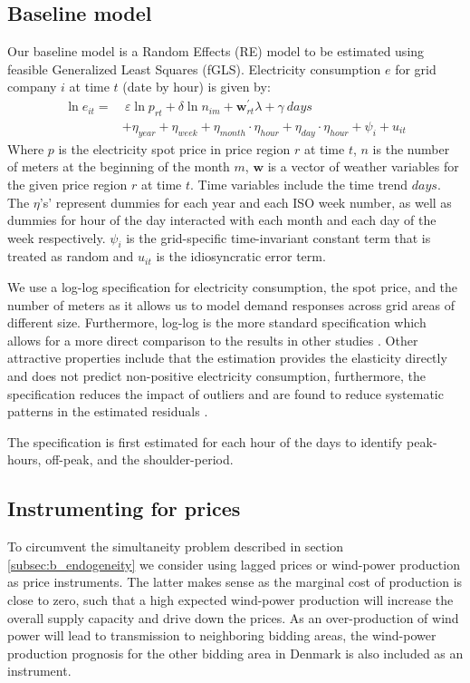 \label{sec:empirical}
\subsection{Baseline model}
\label{subsec:e_model}
Our baseline model is a Random Effects (RE) model to be estimated using feasible Generalized Least Squares (fGLS). Electricity consumption $e$ for grid company $i$ at time $t$ (date by hour) is given by:
\begin{equation}
  \begin{split}
  \ln e_{it}=&\ \varepsilon\ln p_{rt}+\delta\ln n_{im}+\bm{w}^{'}_{rt}\lambda+\gamma\ days\\
  &+\eta_{year}+\eta_{week}+\eta_{month}\cdot\eta_{hour}+\eta_{day}\cdot\eta_{hour}+\psi_i+u_{it}
  \end{split}
  \label{eq:baseline}
\end{equation}
Where $p$ is the electricity spot price in price region $r$ at time $t$, $n$ is the number of meters at the beginning of the month $m$, $\bm{w}$ is a vector of weather variables for the given price region $r$ at time $t$. Time variables include the time trend $days$. The $\eta$'s' represent dummies for each year and each ISO week number, as well as dummies for hour of the day interacted with each month and each day of the week respectively. $\psi_i$ is the grid-specific time-invariant constant term that is treated as random and $u_{it}$ is the idiosyncratic error term.
\par
We use a log-log specification for electricity consumption, the spot price, and the number of meters as it allows us to model demand responses across grid areas of different size. Furthermore, log-log is the more standard specification which allows for a more direct comparison to the results in other studies \citep{burke2017price}. Other attractive properties include that the estimation provides the elasticity directly and does not predict non-positive electricity consumption, furthermore, the specification reduces the impact of outliers and are found to reduce systematic patterns in the estimated residuals \citep{burke2017price}.
\par
The specification is first estimated for each hour of the days to identify peak-hours, off-peak, and the shoulder-period.

\subsection{Instrumenting for prices}
\label{subsec:e_instrumenting}
To circumvent the simultaneity problem described in section \ref{subsec:b_endogeneity} we consider using lagged prices or wind-power production as price instruments. The latter makes sense as the marginal cost of production is close to zero, such that a high expected wind-power production will increase the overall supply capacity and drive down the prices. As an over-production of wind power will lead to transmission to neighboring bidding areas, the wind-power production prognosis for the other bidding area in Denmark is also included as an instrument.

